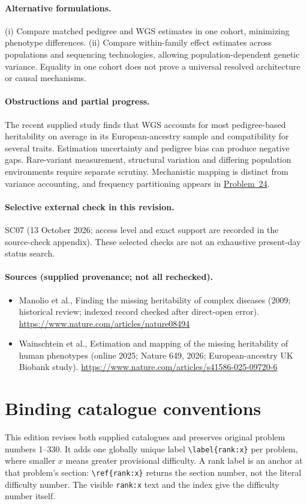 \documentclass[11pt]{article}
\begin{document}
\paragraph{Alternative formulations.} (i) Compare matched pedigree and WGS estimates in one cohort, minimizing phenotype differences. (ii) Compare within-family effect estimates across populations and sequencing technologies, allowing population-dependent genetic variance. Equality in one cohort does not prove a universal resolved architecture or causal mechanisms.
\paragraph{Obstructions and partial progress.} The recent supplied study finds that WGS accounts for most pedigree-based heritability on average in its European-ancestry sample and compatibility for several traits. Estimation uncertainty and pedigree bias can produce negative gaps. Rare-variant measurement, structural variation and differing population environments require separate scrutiny. Mechanistic mapping is distinct from variance accounting, and frequency partitioning appears in \href{https://we-solve.github.io/problems/rare-versus-common-variant-architecture-f865fed0/}{Problem~24}.
\paragraph{Selective external check in this revision.} SC07 (13 October 2026; access level and exact support are recorded in the source-check appendix). These selected checks are not an exhaustive present-day status search.

\paragraph{Sources (supplied provenance; not all rechecked).}
\begin{itemize}
\item Manolio et al., Finding the missing heritability of complex diseases (2009; historical review; indexed record checked after direct-open error). \url{https://www.nature.com/articles/nature08494}
\item Wainschtein et al., Estimation and mapping of the missing heritability of human phenotypes (online 2025; Nature 649, 2026; European-ancestry UK Biobank study). \url{https://www.nature.com/articles/s41586-025-09720-6}
\end{itemize}


\section*{Binding catalogue conventions}
This edition revises both supplied catalogues and preserves original problem numbers 1--330. It adds one globally unique label \verb|\label{rank:x}| per problem, where smaller $x$ means greater provisional difficulty. A rank label is an anchor at that problem's section: \verb|\ref{rank:x}| returns the section number, not the literal difficulty number. The visible \texttt{rank:x} text and the index give the difficulty number itself.
\end{document}
